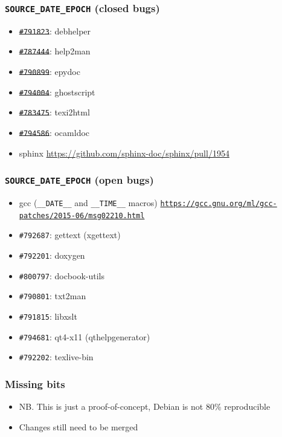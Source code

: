 \documentclass[14pt]{beamer}
\begin{document}
\begin{frame}
 \frametitle{\texttt{SOURCE\_DATE\_EPOCH} (closed bugs)}

 \begin{itemize}
  \item \sout{\texttt{\#791823}}: debhelper
  \item \sout{\texttt{\#787444}}: help2man
  \item \sout{\texttt{\#790899}}: epydoc
  \item \sout{\texttt{\#794004}}: ghostscript
  \item \sout{\texttt{\#783475}}: texi2html
  \item \sout{\texttt{\#794586}}: ocamldoc
  \item sphinx \small{\url{https://github.com/sphinx-doc/sphinx/pull/1954}}
 \end{itemize}

\end{frame}

\begin{frame}
 \frametitle{\texttt{SOURCE\_DATE\_EPOCH} (open bugs)}

 \begin{itemize}
  \item gcc (\texttt{\_\_DATE\_\_} and \texttt{\_\_TIME\_\_} macros) \texttt{\footnotesize{\url{https://gcc.gnu.org/ml/gcc-patches/2015-06/msg02210.html}}}
  \item \texttt{\#792687}: gettext (xgettext)
  \item \texttt{\#792201}: doxygen
  \item \texttt{\#800797}: docbook-utils
  \item \texttt{\#790801}: txt2man
  \item \texttt{\#791815}: libxslt
  \item \texttt{\#794681}: qt4-x11 (qthelpgenerator)
  \item \texttt{\#792202}: texlive-bin
 \end{itemize}

\end{frame}


\begin{frame}
 \frametitle{Missing bits}
 \begin{itemize}
  \item NB. This is just a proof-of-concept, Debian is not 80\%
  reproducible
  \item Changes still need to be merged
 \end{itemize}
\end{frame}
\end{document}

